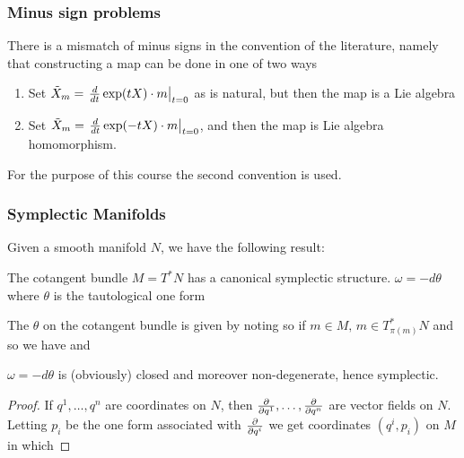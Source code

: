 \documentclass{article}
\begin{document}
\subsubsection{Minus sign problems}
There is a mismatch of minus signs in the convention of the literature, namely that constructing a map 
can be done in one of two ways 
\begin{enumerate}
    \item Set $\tilde{X}_m = \left. \frac{d}{dt} \exp(tX) \cdot m \right\rvert_{t=0}$ as is natural, but then the map is a Lie algebra 
    \item Set $\tilde{X}_m = \left. \frac{d}{dt} \exp(-tX) \cdot m \right\rvert_{t=0}$, and then the map is  Lie algebra homomorphism. 
\end{enumerate}
For the purpose of this course the second convention is used. 

\subsubsection{Symplectic Manifolds}
Given a smooth manifold $N$, we have the following result:

\begin{theorem}
The cotangent bundle $M= T^\ast N$ has a canonical symplectic structure. $\omega = - d\theta$ where $\theta$ is the tautological one form 
\end{theorem}

\begin{definition}
The  $\theta$ on the cotangent bundle is given by noting 
so if $ m \in M, \, m \in T_{\pi(m)}^\ast N$ and so we have 
and 
\end{definition}

\begin{lemma}
$\omega = -d\theta$ is (obviously) closed and moreover non-degenerate, hence symplectic. 
\end{lemma}
\begin{proof}
If $q^1, \dots, q^n$ are coordinates on $N$, then $\frac{\partial}{\partial q^1}, \dots, \frac{\partial}{\partial q^n}$ are vector fields on $N$. Letting $p_i$ be the one form associated with $\frac{\partial}{\partial q^i}$ we get coordinates $(q^i,p_i)$ on $M$ in which 
\end{proof}
\end{document}
